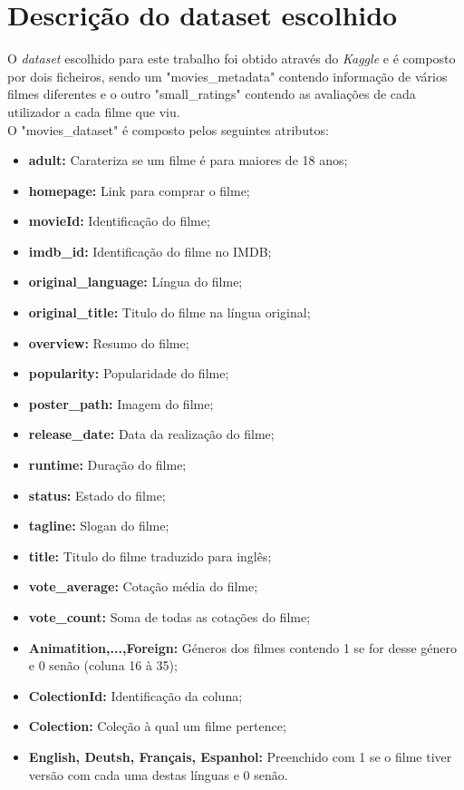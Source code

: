 \section{Descrição do dataset escolhido}

O \textit{dataset} escolhido para este trabalho foi obtido através do \textit{Kaggle} e é composto por dois ficheiros, sendo um "movies\_metadata" contendo informação de vários filmes diferentes e o outro "small\_ratings" contendo as avaliações de cada utilizador a cada filme que viu. \\

O "movies\_dataset"  é composto pelos seguintes atributos:

\begin{itemize}
    \item \textbf{adult:} Carateriza se um filme é para maiores de 18 anos;
    \item \textbf{homepage:} Link para comprar o filme;
    \item \textbf{movieId:} Identificação do filme;
    \item \textbf{imdb\_id:} Identificação do filme no IMDB;
    \item \textbf{original\_language:} Língua do filme;
    \item \textbf{original\_title:} Titulo do filme na língua original;
    \item \textbf{overview:} Resumo do filme;
    \item \textbf{popularity:} Popularidade do filme;
    \item \textbf{poster\_path:} Imagem do filme;
    \item \textbf{release\_date:} Data da realização do filme;
    \item \textbf{runtime:} Duração do filme;
    \item \textbf{status:} Estado do filme;
    \item \textbf{tagline:} Slogan do filme;
    \item \textbf{title:} Titulo do filme traduzido para inglês;
    \item \textbf{vote\_average:} Cotação média do filme;
    \item \textbf{vote\_count:} Soma de todas as cotações do filme;
    \item \textbf{Animatition,...,Foreign:} Géneros dos filmes contendo 1 se for desse género e 0 senão (coluna 16 à 35);
    \item \textbf{ColectionId:} Identificação da coluna;
    \item \textbf{Colection:} Coleção à qual um filme pertence;
    \item \textbf{English, Deutsh, Français, Espanhol:} Preenchido com 1 se o filme tiver versão com cada uma destas línguas e 0 senão.
    \end{itemize}
    
